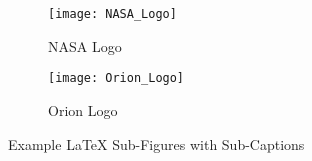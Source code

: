 \begin{figure}[H]
\begin{subfigure}[b]{0.5\textwidth}
   \centering 
   \texttt{[image: NASA\_Logo]}
   \caption{NASA Logo} 
   \label{fig:NASA_Logo_Sub}
\end{subfigure}%
\begin{subfigure}[b]{0.5\textwidth}
   \centering 
   \texttt{[image: Orion\_Logo]}
   \caption{Orion Logo} 
   \label{fig:Orion_Logo_Sub}
\end{subfigure}%
   \caption{Example LaTeX Sub-Figures with Sub-Captions} 
   \label{fig:example-subfigure}
\end{figure}